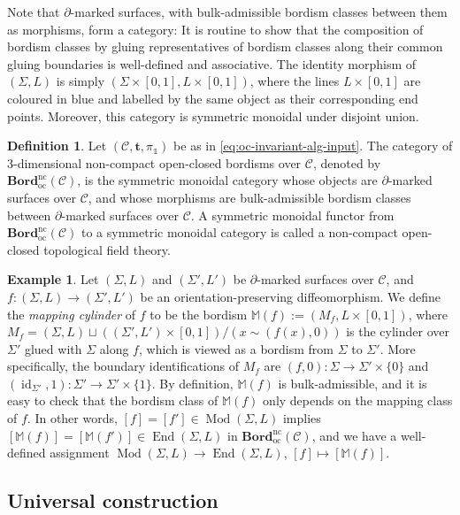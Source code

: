 \documentclass[11pt]{amsart}
\theoremstyle{definition}
\newtheorem{exmp}[thm]{Example}
\newtheorem{definition}[thm]{Definition}
\numberwithin{equation}{section}
\def\bd{{\partial}}
\def\mtr{{\mathbf{t}}} %
\def\ourBord{\mathbf{Bord}^{\operatorname{nc}}_{\operatorname{oc}}}
\def\MCG{\operatorname{Mod}}
\def\cC{\mathcal{C}}
\def\bM{{\mathbb{M}}}
\def\1{{\mathds{1}}}
\def\to{\rightarrow}
\def\End{{\operatorname{End}}}
\def\id{{\operatorname{id}}}
\begin{document}
Note that $\bd$-marked surfaces, with bulk-admissible bordism classes between them as morphisms, form a category: It is routine to show that the composition of bordism classes by gluing representatives of bordism classes along their common gluing boundaries is well-defined and associative. The identity morphism of $(\Sigma, L)$ is simply $(\Sigma \times [0,1], L \times [0,1])$, where the lines $L\times [0,1]$ are coloured in blue and labelled by the same object as their corresponding end points. Moreover, this category is symmetric monoidal under disjoint union. 

\begin{definition}\label{def:Bord-C}
Let $(\cC, \mtr, \pi_\1)$ be as in \eqref{eq:oc-invariant-alg-input}. The category of 3-dimensional non-compact open-closed bordisms over $\cC$, denoted by $\ourBord(\cC)$, is the symmetric monoidal category whose objects are $\bd$-marked surfaces over $\cC$, and whose morphisms are bulk-admissible bordism classes between $\bd$-marked surfaces over $\cC$. A symmetric monoidal functor from $\ourBord(\cC)$ to a symmetric monoidal category is called a non-compact open-closed topological field theory. 
\end{definition}

\begin{exmp}\label{ex:cylinder}
Let $(\Sigma, L)$ and $(\Sigma', L')$ be $\bd$-marked surfaces over $\cC$, and $f: (\Sigma, L) \to (\Sigma', L')$ be an orientation-preserving diffeomorphism. We define the \emph{mapping cylinder} of $f$ to be the bordism $\bM(f):=(M_f, L \times [0,1])$, where $M_f = (\Sigma, L) \sqcup ((\Sigma', L') \times [0, 1]) /(x \sim (f(x), 0))$ is the cylinder over $\Sigma'$ glued with $\Sigma$ along $f$, which is viewed as a bordism from $\Sigma$ to $\Sigma'$. More specifically, the boundary identifications of $M_f$ are $(f, 0): \Sigma \to \Sigma' \times \{0\}$ and $(\id_{\Sigma'}, 1): \Sigma' \to \Sigma'\times\{1\}$. By definition, $\bM(f)$ is bulk-admissible, and it is easy to check that the bordism class of $\bM(f)$ only depends on the mapping class of $f$. In other words, $[f]=[f'] \in \MCG(\Sigma, L)$ implies $[\bM(f)] = [\bM(f')] \in \End(\Sigma, L)$ in $\ourBord(\cC)$, and we have a well-defined assignment $\MCG(\Sigma, L) \to \End(\Sigma, L)$, $[f] \mapsto [\bM(f)]$.
\end{exmp}

\subsection{Universal construction}
\end{document}
